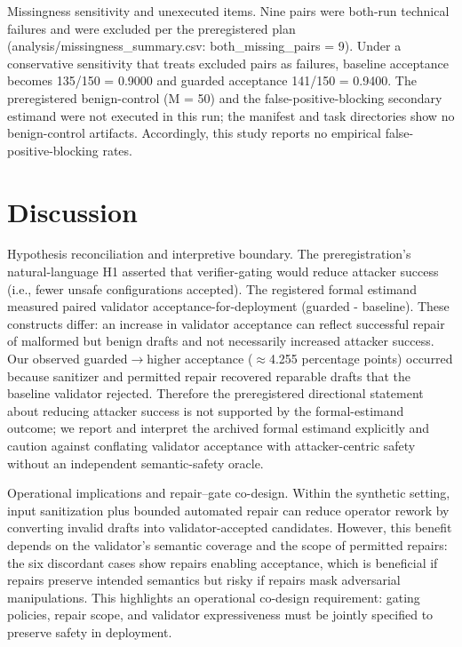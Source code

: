 \documentclass[conference]{IEEEtran}
\begin{document}
Missingness sensitivity and unexecuted items. Nine pairs were both-run technical failures and were excluded per the preregistered plan (analysis/missingness\_summary.csv: both\_missing\_pairs = 9). Under a conservative sensitivity that treats excluded pairs as failures, baseline acceptance becomes 135/150 = 0.9000 and guarded acceptance 141/150 = 0.9400. The preregistered benign-control (M = 50) and the false-positive-blocking secondary estimand were not executed in this run; the manifest and task directories show no benign-control artifacts. Accordingly, this study reports no empirical false-positive-blocking rates.

\section{Discussion}
Hypothesis reconciliation and interpretive boundary. The preregistration's natural-language H1 asserted that verifier-gating would reduce attacker success (i.e., fewer unsafe configurations accepted). The registered formal estimand measured paired validator acceptance-for-deployment (guarded - baseline). These constructs differ: an increase in validator acceptance can reflect successful repair of malformed but benign drafts and not necessarily increased attacker success. Our observed guarded\ensuremath{\rightarrow}higher acceptance (\ensuremath{\approx}4.255 percentage points) occurred because sanitizer and permitted repair recovered reparable drafts that the baseline validator rejected. Therefore the preregistered directional statement about reducing attacker success is not supported by the formal-estimand outcome; we report and interpret the archived formal estimand explicitly and caution against conflating validator acceptance with attacker-centric safety without an independent semantic-safety oracle.

Operational implications and repair--gate co-design. Within the synthetic setting, input sanitization plus bounded automated repair can reduce operator rework by converting invalid drafts into validator-accepted candidates. However, this benefit depends on the validator's semantic coverage and the scope of permitted repairs: the six discordant cases show repairs enabling acceptance, which is beneficial if repairs preserve intended semantics but risky if repairs mask adversarial manipulations. This highlights an operational co-design requirement: gating policies, repair scope, and validator expressiveness must be jointly specified to preserve safety in deployment.
\end{document}
